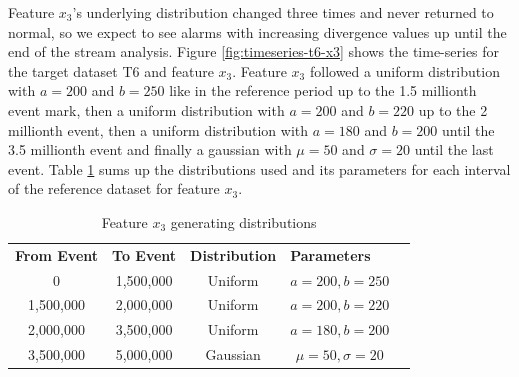 Feature $x_3$'s underlying distribution changed three times and never returned to normal, so we expect to see alarms with increasing divergence values up until the end of the stream analysis. Figure \ref{fig:timeseries-t6-x3} shows the time-series for the target dataset T6 and feature $x_3$. Feature $x_3$ followed a uniform distribution with $a=200$ and $b=250$ like in the reference period up to the 1.5 millionth event mark, then a uniform distribution with $a=200$ and $b=220$ up to the 2 millionth event, then a uniform distribution with $a=180$ and $b=200$ until the 3.5 millionth event and finally a gaussian with $\mu=50$ and $\sigma=20$ until the last event. Table \ref{tbl:multi-feat-x3-changes} sums up the distributions used and its parameters for each interval of the reference dataset for feature $x_3$.
\begin{table}[!htb]
    \begin{center}
    \begin{tabular}{|c|c|c|c|l}
    \cline{1-4}
    \textbf{From Event} & \textbf{To Event} & \textbf{Distribution} & \multicolumn{1}{l|}{\textbf{Parameters}} &  \\ \cline{1-4}
    0                   & 1,500,000         & Uniform               & $a=200, b=250$                           &  \\ \cline{1-4}
    1,500,000           & 2,000,000         & Uniform               & $a=200, b=220$                           &  \\ \cline{1-4}
    2,000,000            & 3,500,000         & Uniform               & $a=180, b=200$                           &  \\ \cline{1-4}
    3,500,000           & 5,000,000         & Gaussian              & $\mu=50, \sigma=20$                      &  \\ \cline{1-4}
    \end{tabular}
    \end{center}
    \caption{Feature $x_3$ generating distributions}
    \label{tbl:multi-feat-x3-changes}
\end{table}

